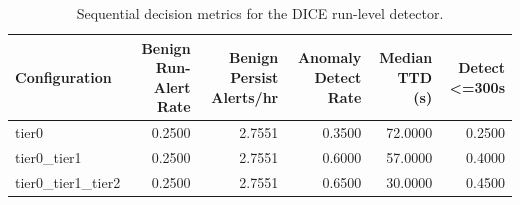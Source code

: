 \begin{table}[t]
\centering
\caption{Sequential decision metrics for the DICE run-level detector.}
\label{tab:dice_sequential_metrics}
\footnotesize
\begin{tabular}{lrrrrr}
\toprule
Configuration & Benign Run-Alert Rate & Benign Persist Alerts/hr & Anomaly Detect Rate & Median TTD (s) & Detect <=300s \\
\midrule
tier0 & 0.2500 & 2.7551 & 0.3500 & 72.0000 & 0.2500 \\
tier0_tier1 & 0.2500 & 2.7551 & 0.6000 & 57.0000 & 0.4000 \\
tier0_tier1_tier2 & 0.2500 & 2.7551 & 0.6500 & 30.0000 & 0.4500 \\
\bottomrule
\end{tabular}

\end{table}
